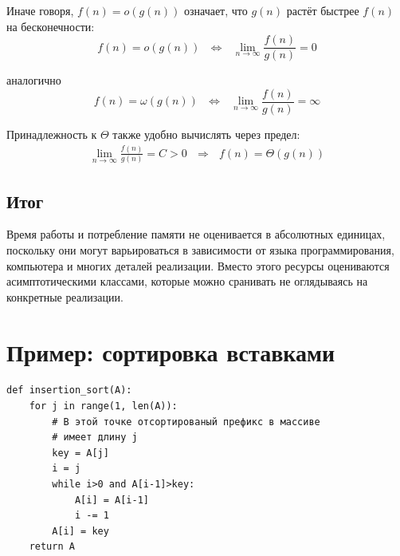 \documentclass[12pt,a4paper]{report}
\begin{document}
Иначе говоря, $f(n)=o(g(n))$ означает, что $g(n)$ растёт быстрее $f(n)$ на бесконечности:
$$
f(n)=o(g(n))  ~~~\Leftrightarrow~~~ \lim_{n\to\infty} \frac{f(n)}{g(n)} = 0
$$

аналогично
$$
f(n)=\omega(g(n))  ~~~\Leftrightarrow~~~ \lim_{n\to\infty} \frac{f(n)}{g(n)} = \infty
$$

Принадлежность к $\Theta$ также удобно вычислять через предел:
$$
\begin{gathered}
\lim_{n\to\infty} \frac{f(n)}{g(n)} = C > 0   ~~~\Rightarrow~~~   f(n) = \Theta(g(n))
\end{gathered}
$$

\subsection*{Итог}

Время работы и потребление памяти не оценивается в абсолютных единицах, поскольку они могут варьироваться в зависимости от языка программирования, компьютера и многих деталей реализации. Вместо этого ресурсы оцениваются асимптотическими классами, которые можно сранивать не оглядываясь на конкретные реализации.

\section{Пример: сортировка вставками}

\begin{verbatim}
def insertion_sort(A):
    for j in range(1, len(A)):
        # В этой точке отсортированый префикс в массиве
        # имеет длину j
        key = A[j]
        i = j
        while i>0 and A[i-1]>key:
            A[i] = A[i-1]
            i -= 1
        A[i] = key
    return A
\end{verbatim}
\end{document}
